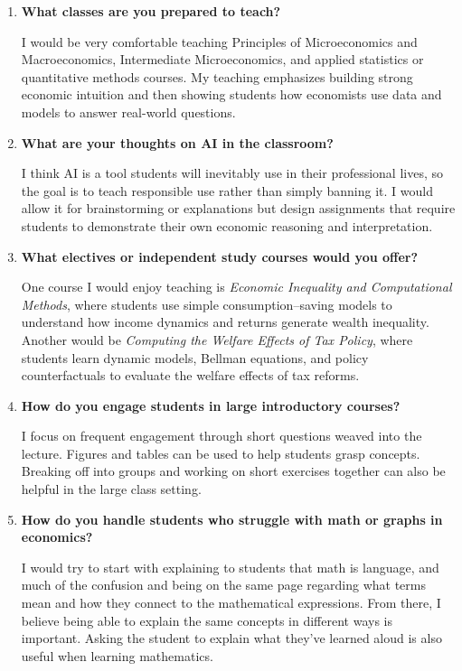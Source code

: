 \documentclass{scrartcl}
\begin{document}
\begin{enumerate}

\item \textbf{What classes are you prepared to teach?}

I would be very comfortable teaching Principles of Microeconomics and Macroeconomics, Intermediate Microeconomics, and applied statistics or quantitative methods courses. My teaching emphasizes building strong economic intuition and then showing students how economists use data and models to answer real-world questions.

\item \textbf{What are your thoughts on AI in the classroom?}

I think AI is a tool students will inevitably use in their professional lives, so the goal is to teach responsible use rather than simply banning it. I would allow it for brainstorming or explanations but design assignments that require students to demonstrate their own economic reasoning and interpretation.

\item \textbf{What electives or independent study courses would you offer?}

One course I would enjoy teaching is \textit{Economic Inequality and Computational Methods}, where students use simple consumption--saving models to understand how income dynamics and returns generate wealth inequality. Another would be \textit{Computing the Welfare Effects of Tax Policy}, where students learn dynamic models, Bellman equations, and policy counterfactuals to evaluate the welfare effects of tax reforms.

\item \textbf{How do you engage students in large introductory courses?}

I focus on frequent engagement through short questions weaved into the lecture. Figures and tables can be used to help students grasp concepts. Breaking off into groups and working on short exercises together can also be helpful in the large class setting.

\item \textbf{How do you handle students who struggle with math or graphs in economics?}

I would try to start with explaining to students that math is language, and much of the confusion and being on the same page regarding what terms mean and how they connect to the mathematical expressions. From there, I believe being able to explain the same concepts in different ways is important. Asking the student to explain what they've learned aloud is also useful when learning mathematics. 


\end{enumerate}
\end{document}
